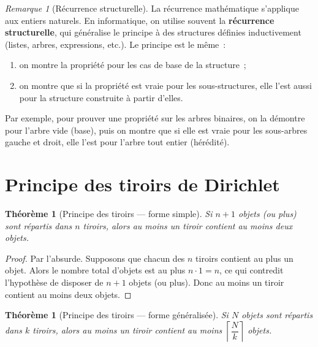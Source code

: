 \documentclass[12pt,a4paper,openany]{book}
\theoremstyle{definition}
\theoremstyle{plain}
\newtheorem{theoreme}[definition]{Théorème}
\theoremstyle{remark}
\newtheorem{remarque}[definition]{Remarque}
\begin{document}
\begin{remarque}[R\'ecurrence structurelle]\label{rem:rec-structurelle}
  La r\'ecurrence math\'ematique s'applique aux entiers naturels. En informatique, on utilise souvent la \textbf{r\'ecurrence structurelle}, qui g\'en\'eralise le principe \`a des structures d\'efinies inductivement (listes, arbres, expressions, etc.). Le principe est le m\^eme~:
  \begin{enumerate}[label=(\roman*)]
    \item on montre la propri\'et\'e pour les cas de base de la structure~;
    \item on montre que si la propri\'et\'e est vraie pour les sous-structures, elle l'est aussi pour la structure construite \`a partir d'elles.
  \end{enumerate}
  Par exemple, pour prouver une propri\'et\'e sur les arbres binaires, on la d\'emontre pour l'arbre vide (base), puis on montre que si elle est vraie pour les sous-arbres gauche et droit, elle l'est pour l'arbre tout entier (h\'er\'edit\'e).
\end{remarque}

\section{Principe des tiroirs de Dirichlet}
\label{sec:pigeonhole}

\begin{theoreme}[Principe des tiroirs --- forme simple]\label{thm:pigeonhole-simple}
  Si $n + 1$ objets (ou plus) sont r\'epartis dans $n$ tiroirs, alors au moins un tiroir contient au moins deux objets.
\end{theoreme}

\begin{proof}
  Par l'absurde. Supposons que chacun des $n$ tiroirs contient au plus un objet. Alors le nombre total d'objets est au plus $n \cdot 1 = n$, ce qui contredit l'hypoth\`ese de disposer de $n+1$ objets (ou plus). Donc au moins un tiroir contient au moins deux objets.
\end{proof}

\begin{theoreme}[Principe des tiroirs --- forme g\'en\'eralis\'ee]\label{thm:pigeonhole-gen}
  Si $N$ objets sont r\'epartis dans $k$ tiroirs, alors au moins un tiroir contient au moins $\left\lceil \dfrac{N}{k} \right\rceil$ objets.
\end{theoreme}
\end{document}
